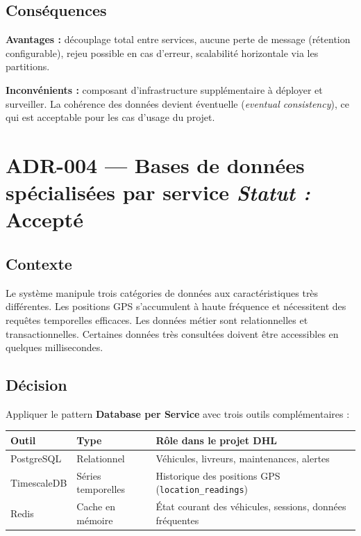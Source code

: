 \documentclass[10pt,a4paper]{article}
\newcommand{\adrstatus}[1]{\hfill{\small\color{muted}\textit{Statut :} \textbf{#1}}}
\begin{document}
\subsection{Conséquences}
\textbf{Avantages :} découplage total entre services, aucune perte de message (rétention configurable), rejeu possible en cas d'erreur, scalabilité horizontale via les partitions.

\noindent\textbf{Inconvénients :} composant d'infrastructure supplémentaire à déployer et surveiller. La cohérence des données devient éventuelle (\textit{eventual consistency}), ce qui est acceptable pour les cas d'usage du projet.

\section{ADR-004 --- Bases de données spécialisées par service \adrstatus{Accepté}}

\subsection{Contexte}
Le système manipule trois catégories de données aux caractéristiques très différentes. Les positions GPS s'accumulent à haute fréquence et nécessitent des requêtes temporelles efficaces. Les données métier sont relationnelles et transactionnelles. Certaines données très consultées doivent être accessibles en quelques millisecondes.

\subsection{Décision}
Appliquer le pattern \textbf{Database per Service} avec trois outils complémentaires :

\vspace{4pt}
\begin{tabularx}{\linewidth}{llX}
  \toprule
  \small\textbf{Outil} & \small\textbf{Type} & \small\textbf{Rôle dans le projet DHL} \\
  \midrule
  PostgreSQL   & Relationnel        & Véhicules, livreurs, maintenances, alertes \\
  TimescaleDB  & Séries temporelles & Historique des positions GPS (\texttt{location\_readings}) \\
  Redis        & Cache en mémoire   & État courant des véhicules, sessions, données fréquentes \\
  \bottomrule
\end{tabularx}
\end{document}
